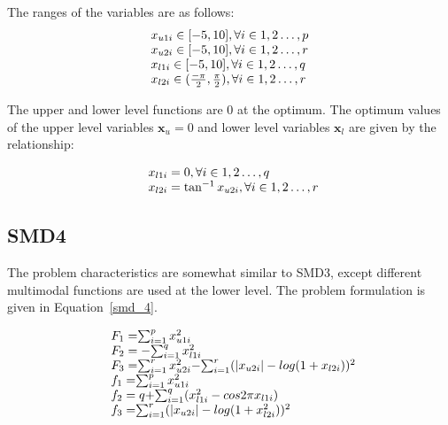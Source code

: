 The ranges of the variables are as follows:
\begin{equation}
\begin{array}{lr}
$$x_{u1i} \in  [-5,10],          \forall i \in {1,2\ldots,p}$$\\
$$x_{u2i} \in  [-5,10],          \forall i \in {1,2\ldots,r}$$\\
$$x_{l1i} \in  [-5,10],          \forall i \in {1,2\ldots,q}$$\\
$$x_{l2i} \in  (\frac{-\pi}{2},\frac{\pi}{2}),          \forall i \in {1,2\ldots,r}$$
\end{array}
\label{smd_eqn3}
\end{equation}

The upper and lower level functions are 0 at the optimum. The optimum values of the upper level variables $\mathbf{x}_u=0$ and lower level variables $\mathbf{x}_l$ are given by the relationship: 

\begin{equation}
\begin{array}{lr}
\text{}\hspace{2mm} x_{l1i}=0,  \forall i \in {1,2\ldots,q} \\
\text{}\hspace{2mm} x_{l2i}=\tan^{-1} x_{u2i},  \forall i \in {1,2\ldots,r} \\
\end{array}
\label{basic_3}
\end{equation}

\subsection{SMD4}

The problem characteristics are somewhat similar to SMD3, except different multimodal functions are used at the lower level. The problem formulation is given in Equation~\ref{smd_4}.


\begin{equation}
\begin{array}{lr}
\text{}\hspace{2mm} F_1=$$\sum_{	i=1}^{p} x_{u1i}^{2} $$\\
\text{}\hspace{2mm} F_2=-$$\sum_{	i=1}^{q} x_{l1i}^{2} $$\\
\text{}\hspace{2mm} F_3=$$\sum_{	i=1}^{r} x_{u2i}^{2} $$-$$\sum_{	i=1}^{r} (|x_{u2i}|-log (1+x_{l2i}))^{2} $$\\
\text{}\hspace{2mm} f_1=$$\sum_{	i=1}^{p} x_{u1i}^{2} $$\\
\text{}\hspace{2mm} f_2=q+$$\sum_{	i=1}^{q} (x_{l1i}^{2}-cos2 \pi x_{l1i}) $$\\
\text{}\hspace{2mm} f_3=$$\sum_{	i=1}^{r} (|x_{u2i}|-log (1+x_{l2i}^{2}))^{2} $$\\

\end{array}
\label{smd_4}
\end{equation}



